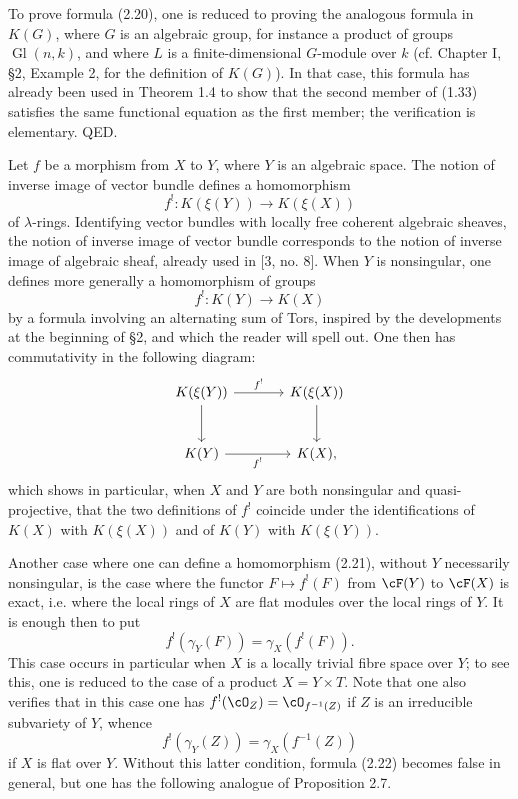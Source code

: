 To prove formula (2.20), one is reduced to proving the analogous formula in $K(G)$, where $G$ is an algebraic group, for instance a product of groups $\operatorname{Gl}(n,k)$, and where $L$ is a finite-dimensional $G$-module over $k$ (cf. Chapter I, \S 2, Example 2, for the definition of $K(G)$). In that case, this formula has already been used in Theorem 1.4 to show that the second member of (1.33) satisfies the same functional equation as the first member; the verification is elementary. QED.

Let $f$ be a morphism from $X$ to $Y$, where $Y$ is an algebraic space. The notion of inverse image of vector bundle defines a homomorphism
\[
 f^!:K(\xi(Y))\longrightarrow K(\xi(X))
\]
of $\lambda$-rings. Identifying vector bundles with locally free coherent algebraic sheaves, the notion of inverse image of vector bundle corresponds to the notion of inverse image of algebraic sheaf, already used in [3, no. 8]. When $Y$ is nonsingular, one defines more generally a homomorphism of groups
\begin{equation}\tag{2.21}
 f^!:K(Y)\longrightarrow K(X)
\end{equation}
by a formula involving an alternating sum of Tors, inspired by the developments at the beginning of \S 2, and which the reader will spell out. One then has commutativity in the following diagram:
\[
\begin{tikzcd}[column sep=large,row sep=large]
K(\xi(Y)) \arrow[r,"f^!"] \arrow[d] & K(\xi(X)) \arrow[d]\\
K(Y) \arrow[r,"f^!"'] & K(X),
\end{tikzcd}
\]
which shows in particular, when $X$ and $Y$ are both nonsingular and quasi-projective, that the two definitions of $f^!$ coincide under the identifications of $K(X)$ with $K(\xi(X))$ and of $K(Y)$ with $K(\xi(Y))$.

Another case where one can define a homomorphism (2.21), without $Y$ necessarily nonsingular, is the case where the functor $F\mapsto f^!(F)$ from $\cF(Y)$ to $\cF(X)$ is exact, i.e. where the local rings of $X$ are flat modules over the local rings of $Y$. It is enough then to put
\[
 f^!(\gamma_Y(F))=\gamma_X(f^!(F)).
\]
This case occurs in particular when $X$ is a locally trivial fibre space over $Y$; to see this, one is reduced to the case of a product $X=Y\times T$. Note that one also verifies that in this case one has $f^!(\cO_Z)=\cO_{f^{-1}(Z)}$ if $Z$ is an irreducible subvariety of $Y$, whence
\begin{equation}\tag{2.22}
 f^!(\gamma_Y(Z))=\gamma_X(f^{-1}(Z))
\end{equation}
if $X$ is flat over $Y$. Without this latter condition, formula (2.22) becomes false in general, but one has the following analogue of Proposition 2.7.

